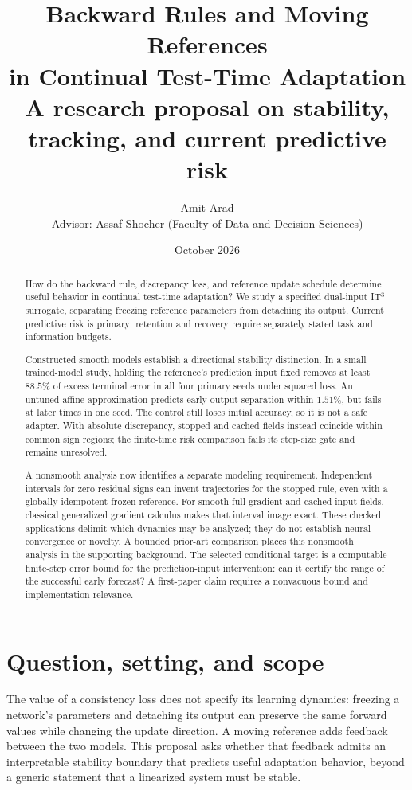 \documentclass[11pt,a4paper]{article}
\title{Backward Rules and Moving References\\in Continual Test-Time Adaptation\\[0.4em]
\large A research proposal on stability, tracking, and current predictive risk}
\author{Amit Arad\\[0.3em]
\small Advisor: Assaf Shocher (Faculty of Data and Decision Sciences)}
\date{October 2026}
\begin{document}
\maketitle
\begin{abstract}
How do the backward rule, discrepancy loss, and reference update schedule
determine useful behavior in continual test-time adaptation? We study a
specified dual-input IT$^3$ surrogate, separating freezing reference
parameters from detaching its output. Current predictive risk is primary;
retention and recovery require separately stated task and information budgets.

Constructed smooth models establish a directional stability distinction.
In a small trained-model study, holding the reference's prediction input
fixed removes at least $88.5\%$ of excess terminal error in all four primary
seeds under squared loss. An untuned affine approximation predicts early
output separation within $1.51\%$, but fails at later times in one seed.
The control still loses initial accuracy, so it is not a safe adapter.
With absolute discrepancy, stopped and cached fields instead coincide
within common sign regions; the finite-time risk comparison fails its
step-size gate and remains unresolved.

A nonsmooth analysis now identifies a separate modeling requirement.
Independent intervals for zero residual signs can invent trajectories for
the stopped rule, even with a globally idempotent frozen reference.
For smooth full-gradient and cached-input fields, classical generalized
gradient calculus makes that interval image exact. These checked
applications delimit which dynamics may be analyzed; they do not establish
neural convergence or novelty. A bounded prior-art comparison places this
nonsmooth analysis in the supporting background. The selected conditional
target is a computable finite-step error bound for the prediction-input
intervention: can it certify the range of the successful early forecast?
A first-paper claim requires a nonvacuous bound and implementation relevance.
\end{abstract}

\section{Question, setting, and scope}
The value of a consistency loss does not specify its learning dynamics:
freezing a network's parameters and detaching its output can preserve the
same forward values while changing the update direction. A moving reference
adds feedback between the two models. This proposal asks whether that
feedback admits an interpretable stability boundary that predicts useful
adaptation behavior, beyond a generic statement that a linearized system
must be stable.
\end{document}
